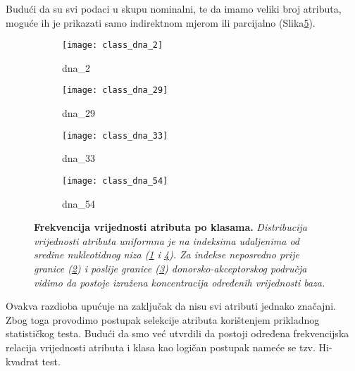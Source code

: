 Budući da su svi podaci u skupu nominalni, te da imamo veliki broj atributa, moguće ih je prikazati samo indirektnom mjerom ili parcijalno (Slika\ref{fig:class_dna_x}).
\begin{center}
   \begin{figure}[ht!]
   \begin{subfigure}{.5\textwidth}
         \texttt{[image: class\_dna\_2]}
         \caption{dna{\_}2}
         \label{fig:class_dna_2}
   \end{subfigure}
   \begin{subfigure}{.5\textwidth}
         \texttt{[image: class\_dna\_29]}
         \caption{dna{\_}29}
         \label{fig:class_dna_29}
   \end{subfigure}
   \begin{subfigure}{.5\textwidth}
         \texttt{[image: class\_dna\_33]}
         \caption{dna{\_}33}
         \label{fig:class_dna_33}
   \end{subfigure}
   \begin{subfigure}{.5\textwidth}
         \texttt{[image: class\_dna\_54]}
         \caption{dna{\_}54}
         \label{fig:class_dna_54}
   \end{subfigure}
   \caption[Dijagram rasipanja vrijednosti atributa po klasama]
   {\textbf{Frekvencija vrijednosti atributa po klasama.}\textit{ Distribucija vrijednosti atributa uniformna je na indeksima udaljenima od sredine nukleotidnog niza (\ref{fig:class_dna_2} i \ref{fig:class_dna_54}). Za indekse neposredno prije granice (\ref{fig:class_dna_29}) i poslije granice (\ref{fig:class_dna_33}) donorsko-akceptorskog područja vidimo da postoje izražena koncentracija određenih vrijednosti baza.}}
    \label{fig:class_dna_x}
   \end{figure}
\end{center}
Ovakva razdioba upućuje na zaključak da nisu svi atributi jednako značajni. Zbog toga provodimo postupak selekcije atributa korištenjem prikladnog statističkog testa. Budući da smo već utvrdili da postoji određena frekvencijska relacija vrijednosti atributa i klasa kao logičan postupak nameće se tzv. Hi-kvadrat test.
